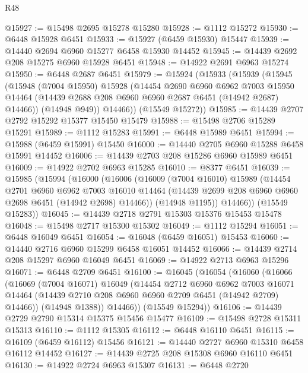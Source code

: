\begin{lexlean}{R48}
\begin{coremodule}
@15927 := @15498 @2695 @15278 @15280
@15928 := @1112 @15272
@15930 := @6448 @15928 @6451
@15933 := @15927 (@6459 @15930) @15447
@15939 := @14440 @2694 @6960 @15277 @6458 @15930 @14452
@15945 := @14439 @2692 @208 @15275 @6960 @15928 @6451
@15948 := @14922 @2691 @6963 @15274
@15950 := @6448 @2687 @6451
@15979 := @15924
    (@15933
      (@15939
        (@15945
          (@15948
            (@7004 @15950)
            @15928
            (@14454
              @2690
              @6960
              @6962
              @7003
              @15950
              @14464
              (@14439 @2688 @208 @6960 @6960 @2687 @6451 (@14942 @2687) @14466))
            (@14948 @949))
          @14466))
      (@15549 @15272))
@15985 := @14439 @2707 @2792 @15292 @15377 @15450 @15479
@15988 := @15498 @2706 @15289 @15291
@15989 := @1112 @15283
@15991 := @6448 @15989 @6451
@15994 := @15988 (@6459 @15991) @15450
@16000 := @14440 @2705 @6960 @15288 @6458 @15991 @14452
@16006 := @14439 @2703 @208 @15286 @6960 @15989 @6451
@16009 := @14922 @2702 @6963 @15285
@16010 := @8377 @6451
@16039 := @15985
    (@15994
      (@16000
        (@16006
          (@16009
            (@7004 @16010)
            @15989
            (@14454
              @2701
              @6960
              @6962
              @7003
              @16010
              @14464
              (@14439 @2699 @208 @6960 @6960 @2698 @6451 (@14942 @2698) @14466))
            (@14948 @1195))
          @14466))
      (@15549 @15283))
@16045 := @14439 @2718 @2791 @15303 @15376 @15453 @15478
@16048 := @15498 @2717 @15300 @15302
@16049 := @1112 @15294
@16051 := @6448 @16049 @6451
@16054 := @16048 (@6459 @16051) @15453
@16060 := @14440 @2716 @6960 @15299 @6458 @16051 @14452
@16066 := @14439 @2714 @208 @15297 @6960 @16049 @6451
@16069 := @14922 @2713 @6963 @15296
@16071 := @6448 @2709 @6451
@16100 := @16045
    (@16054
      (@16060
        (@16066
          (@16069
            (@7004 @16071)
            @16049
            (@14454
              @2712
              @6960
              @6962
              @7003
              @16071
              @14464
              (@14439 @2710 @208 @6960 @6960 @2709 @6451 (@14942 @2709) @14466))
            (@14948 @1388))
          @14466))
      (@15549 @15294))
@16106 := @14439 @2729 @2790 @15314 @15375 @15456 @15477
@16109 := @15498 @2728 @15311 @15313
@16110 := @1112 @15305
@16112 := @6448 @16110 @6451
@16115 := @16109 (@6459 @16112) @15456
@16121 := @14440 @2727 @6960 @15310 @6458 @16112 @14452
@16127 := @14439 @2725 @208 @15308 @6960 @16110 @6451
@16130 := @14922 @2724 @6963 @15307
@16131 := @6448 @2720

\end{coremodule}
\end{lexlean}
